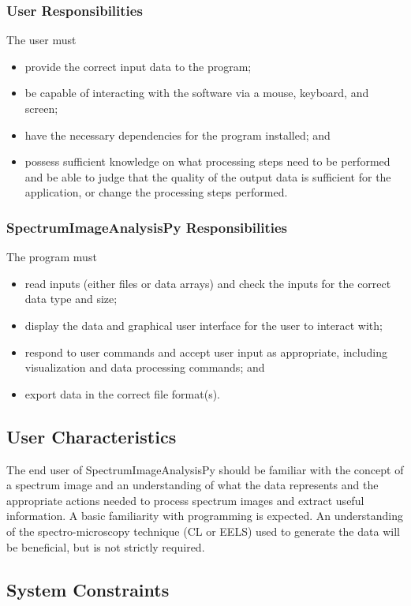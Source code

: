 \documentclass[12pt]{article}
\newcommand{\progname}{SpectrumImageAnalysisPy} %
\begin{document}
\subsubsection{User Responsibilities}
The user must
\begin{itemize}
	\item provide the correct input data to the program;
	\item be capable of interacting with the software via a mouse, keyboard, and
screen;
	\item have the necessary dependencies for the program installed; and
	\item possess sufficient knowledge on what processing steps need to be
performed and be able to judge that the quality of the output data is sufficient
for the application, or change the processing steps performed.
\end{itemize}
    
\subsubsection{\progname{} Responsibilities}
The program must
\begin{itemize}
	\item read inputs (either files or data arrays) and check the inputs for the
correct data type and size;
	\item display the data and graphical user interface for the user to interact
with;
	\item respond to user commands and accept user input as appropriate, including
visualization and data processing commands; and
	\item export data in the correct file format(s).
\end{itemize}

\subsection{User Characteristics} \label{SecUserCharacteristics}

The end user of \progname{} should be familiar with the concept of a spectrum
image and an understanding of what the data represents and the appropriate
actions needed to process spectrum images and extract useful information. A
basic familiarity with programming is expected. An
understanding of the spectro-microscopy technique (CL or EELS) used to generate
the data will
be beneficial, but is not strictly required. 

\subsection{System Constraints}
\end{document}

